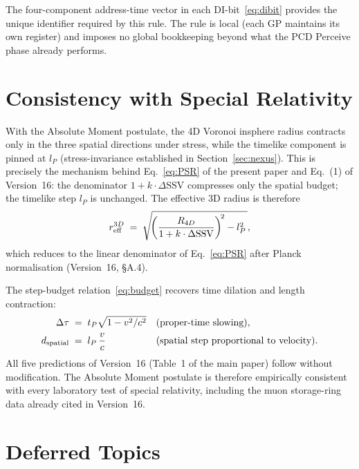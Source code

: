 \documentclass[12pt]{article}
\begin{document}
The four-component address-time vector in each DI-bit~\eqref{eq:dibit}
provides the unique identifier required by this rule.  The rule is local
(each GP maintains its own register) and imposes no global bookkeeping beyond
what the PCD Perceive phase already performs.

\section{Consistency with Special Relativity}
\label{sec:sr}

With the Absolute Moment postulate, the 4D Voronoi insphere radius contracts
only in the three spatial directions under stress, while the timelike
component is pinned at $l_P$ (stress-invariance established in
Section~\ref{sec:nexus}).  This is precisely the mechanism behind
Eq.~\eqref{eq:PSR} of the present paper and Eq.~(1) of Version~16: the
denominator $1 + k\cdot\Delta\text{SSV}$ compresses only the spatial budget;
the timelike step $l_P$ is unchanged.  The effective 3D radius is therefore
\begin{equation}
  r_{\rm eff}^{3D}
  \;=\; \sqrt{\!\left(\frac{R_{4D}}{1+k\cdot\Delta\text{SSV}}\right)^{\!2}
              - l_P^2\,},
\end{equation}
which reduces to the linear denominator of Eq.~\eqref{eq:PSR} after Planck
normalisation (Version~16, \S A.4).

The step-budget relation~\eqref{eq:budget} recovers time dilation and length
contraction:
\begin{align}
  \Delta\tau &\;=\; t_P\sqrt{1 - v^2/c^2}
  &&\text{(proper-time slowing)},\\
  d_{\rm spatial} &\;=\; l_P\,\frac{v}{c}
  &&\text{(spatial step proportional to velocity)}.
\end{align}
All five predictions of Version~16 (Table~1 of the main paper) follow without
modification.  The Absolute Moment postulate is therefore empirically
consistent with every laboratory test of special relativity, including the
muon storage-ring data already cited in Version~16.

\section{Deferred Topics}
\label{sec:deferred}
\end{document}
